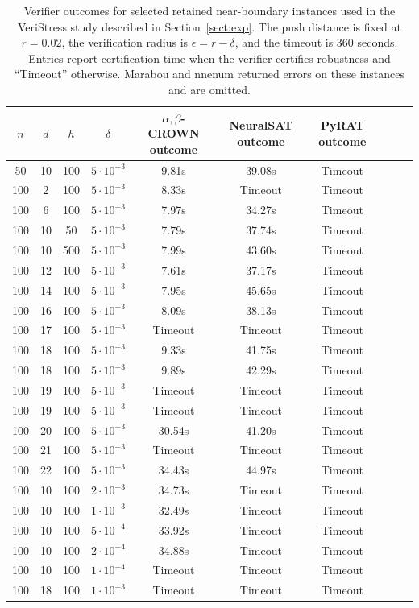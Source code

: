 \documentclass{article}
\theoremstyle{definition}
\begin{document}
\begin{table}[th]
\caption{Verifier outcomes for selected retained near-boundary instances used in the VeriStress study described in Section~\ref{sect:exp}. The push distance is fixed at $r=0.02$, the verification radius is $\epsilon=r-\delta$, and the timeout is $360$ seconds. Entries report certification time when the verifier certifies robustness and ``Timeout'' otherwise. Marabou and nnenum returned errors on these instances and are omitted.}
\centering
\begin{tabular}{c c c c c c c c c c}
\toprule
$n$ & $d$ & $h$ & $\delta$ 
& $\alpha,\beta$-CROWN outcome 
& NeuralSAT outcome 
& PyRAT outcome\\
\midrule
50  & 10 & 100 & $5\cdot10^{-3}$ & 9.81s & 39.08s & Timeout \\
100 & 2  & 100 & $5\cdot10^{-3}$ &  8.33s & Timeout & Timeout \\
100 & 6  & 100 & $5\cdot10^{-3}$ &  7.97s & 34.27s & Timeout \\
100 & 10 & 50  & $5\cdot10^{-3}$ &  7.79s & 37.74s & Timeout \\
100 & 10 & 500 & $5\cdot10^{-3}$ &  7.99s & 43.60s & Timeout \\
100 & 12 & 100 & $5\cdot10^{-3}$ &  7.61s & 37.17s & Timeout \\
100 & 14 & 100 & $5\cdot10^{-3}$ &  7.95s & 45.65s & Timeout \\
100 & 16 & 100 & $5\cdot10^{-3}$ &  8.09s & 38.13s & Timeout \\
100 & 17 & 100 & $5\cdot10^{-3}$ &  Timeout & Timeout & Timeout \\
100 & 18 & 100 & $5\cdot10^{-3}$ &  9.33s & 41.75s & Timeout \\
100 & 18 & 100 & $5\cdot10^{-3}$ &  9.89s & 42.29s & Timeout \\
100 & 19 & 100 & $5\cdot10^{-3}$ &  Timeout & Timeout & Timeout \\
100 & 19 & 100 & $5\cdot10^{-3}$ &  Timeout & Timeout & Timeout \\
100 & 20 & 100 & $5\cdot10^{-3}$ &  30.54s & 41.20s & Timeout \\
100 & 21 & 100 & $5\cdot10^{-3}$ &  Timeout & Timeout & Timeout \\
100 & 22 & 100 & $5\cdot10^{-3}$ &  34.43s & 44.97s & Timeout \\
100 & 10 & 100 & $2\cdot10^{-3}$ &  34.73s & Timeout & Timeout \\
100 & 10 & 100 & $1\cdot10^{-3}$ &  32.49s & Timeout & Timeout \\
100 & 10 & 100 & $5\cdot10^{-4}$ &  33.92s & Timeout & Timeout \\
100 & 10 & 100 & $2\cdot10^{-4}$ &  34.88s & Timeout & Timeout \\
100 & 10 & 100 & $1\cdot10^{-4}$ &  Timeout & Timeout & Timeout \\
100 & 18 & 100 & $1\cdot10^{-3}$ &  Timeout & Timeout & Timeout \\
\bottomrule
\end{tabular}
\label{tab:VeriStress-boundary-verification-results}
\end{table}
\end{document}
